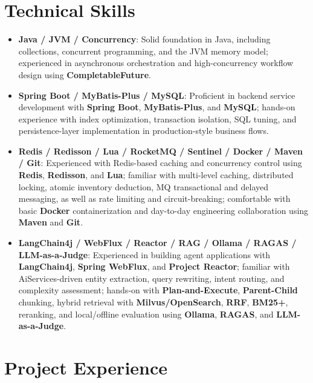 \documentclass{resume}
\begin{document}
\section{Technical Skills}
\begin{itemize}[parsep=0.5ex]
    \item \textbf{Java / JVM / Concurrency}: Solid foundation in Java, including collections, concurrent programming, and the JVM memory model; experienced in asynchronous orchestration and high-concurrency workflow design using \textbf{CompletableFuture}.
    \item \textbf{Spring Boot / MyBatis-Plus / MySQL}: Proficient in backend service development with \textbf{Spring Boot}, \textbf{MyBatis-Plus}, and \textbf{MySQL}; hands-on experience with index optimization, transaction isolation, SQL tuning, and persistence-layer implementation in production-style business flows.
    \item \textbf{Redis / Redisson / Lua / RocketMQ / Sentinel / Docker / Maven / Git}: Experienced with Redis-based caching and concurrency control using \textbf{Redis}, \textbf{Redisson}, and \textbf{Lua}; familiar with multi-level caching, distributed locking, atomic inventory deduction, MQ transactional and delayed messaging, as well as rate limiting and circuit-breaking; comfortable with basic \textbf{Docker} containerization and day-to-day engineering collaboration using \textbf{Maven} and \textbf{Git}.
    \item \textbf{LangChain4j / WebFlux / Reactor / RAG / Ollama / RAGAS / LLM-as-a-Judge}: Experienced in building agent applications with \textbf{LangChain4j}, \textbf{Spring WebFlux}, and \textbf{Project Reactor}; familiar with AiServices-driven entity extraction, query rewriting, intent routing, and complexity assessment; hands-on with \textbf{Plan-and-Execute}, \textbf{Parent-Child} chunking, hybrid retrieval with \textbf{Milvus/OpenSearch}, \textbf{RRF}, \textbf{BM25+}, reranking, and local/offline evaluation using \textbf{Ollama}, \textbf{RAGAS}, and \textbf{LLM-as-a-Judge}.
\end{itemize}

\section{Project Experience}
\end{document}

